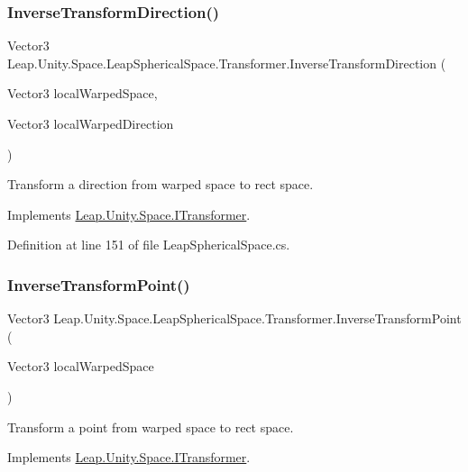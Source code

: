 \subsubsection{\texorpdfstring{InverseTransformDirection()}{InverseTransformDirection()}}
{\footnotesize\ttfamily Vector3 Leap.\+Unity.\+Space.\+Leap\+Spherical\+Space.\+Transformer.\+Inverse\+Transform\+Direction (\begin{DoxyParamCaption}\item[{Vector3}]{local\+Warped\+Space,  }\item[{Vector3}]{local\+Warped\+Direction }\end{DoxyParamCaption})}



Transform a direction from warped space to rect space. 



Implements \mbox{\hyperlink{interface_leap_1_1_unity_1_1_space_1_1_i_transformer_aa555a28ab51ed506732bb88756f06168}{Leap.\+Unity.\+Space.\+I\+Transformer}}.



Definition at line 151 of file Leap\+Spherical\+Space.\+cs.

\mbox{\label{class_leap_1_1_unity_1_1_space_1_1_leap_spherical_space_1_1_transformer_acd09436f553794da5536559b5c3bfcab}} 
\subsubsection{\texorpdfstring{InverseTransformPoint()}{InverseTransformPoint()}}
{\footnotesize\ttfamily Vector3 Leap.\+Unity.\+Space.\+Leap\+Spherical\+Space.\+Transformer.\+Inverse\+Transform\+Point (\begin{DoxyParamCaption}\item[{Vector3}]{local\+Warped\+Space }\end{DoxyParamCaption})}



Transform a point from warped space to rect space. 



Implements \mbox{\hyperlink{interface_leap_1_1_unity_1_1_space_1_1_i_transformer_ad919653073748169561e99cace4f5931}{Leap.\+Unity.\+Space.\+I\+Transformer}}.



